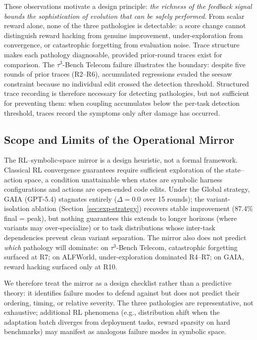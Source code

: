 These observations motivate a design principle: \textit{the richness of the feedback signal bounds the sophistication of evolution that can be safely performed}. From scalar reward alone, none of the three pathologies is detectable: a score change cannot distinguish reward hacking from genuine improvement, under-exploration from convergence, or catastrophic forgetting from evaluation noise. Trace structure makes each pathology diagnosable, provided prior-round traces exist for comparison. The $\tau^3$-Bench Telecom failure illustrates the boundary: despite five rounds of prior traces (R2--R6), accumulated regressions evaded the seesaw constraint because no individual edit crossed the detection threshold. Structured trace recording is therefore necessary for detecting pathologies, but not sufficient for preventing them: when coupling accumulates below the per-task detection threshold, traces record the symptoms only after damage has occurred.



\subsection{Scope and Limits of the Operational Mirror}

The RL--symbolic-space mirror is a design heuristic, not a formal framework. Classical RL convergence guarantees require sufficient exploration of the state--action space, a condition unattainable when states are symbolic harness configurations and actions are open-ended code edits. Under the Global strategy, GAIA (GPT-5.4) stagnates entirely ($\Delta{=}0.0$ over 15 rounds); the variant-isolation ablation (Section~\ref{sec:exp-strategy}) recovers stable improvement (87.4\% final = peak), but nothing guarantees this extends to longer horizons (where variants may over-specialize) or to task distributions whose inter-task dependencies prevent clean variant separation. The mirror also does not predict \textit{which} pathology will dominate: on $\tau^3$-Bench Telecom, catastrophic forgetting surfaced at R7; on ALFWorld, under-exploration dominated R4--R7; on GAIA, reward hacking surfaced only at R10.

We therefore treat the mirror as a design checklist rather than a predictive theory: it identifies failure modes to defend against but does not predict their ordering, timing, or relative severity. The three pathologies are representative, not exhaustive; additional RL phenomena (e.g., distribution shift when the adaptation batch diverges from deployment tasks, reward sparsity on hard benchmarks) may manifest as analogous failure modes in symbolic space.

